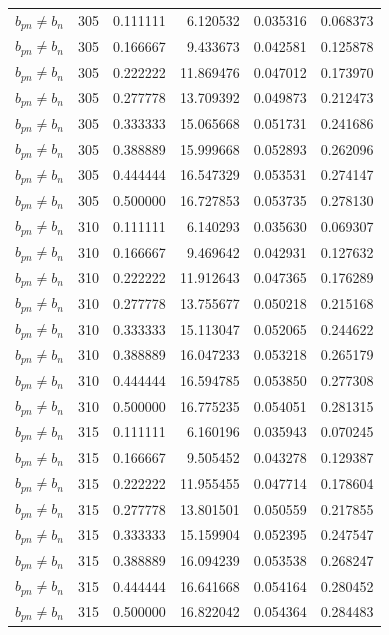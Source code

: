 \begin{longtable}{l r r r r r}
$b_{pn} \neq b_n$ & 305 & 0.111111 & 6.120532 & 0.035316 & 0.068373 \\
$b_{pn} \neq b_n$ & 305 & 0.166667 & 9.433673 & 0.042581 & 0.125878 \\
$b_{pn} \neq b_n$ & 305 & 0.222222 & 11.869476 & 0.047012 & 0.173970 \\
$b_{pn} \neq b_n$ & 305 & 0.277778 & 13.709392 & 0.049873 & 0.212473 \\
$b_{pn} \neq b_n$ & 305 & 0.333333 & 15.065668 & 0.051731 & 0.241686 \\
$b_{pn} \neq b_n$ & 305 & 0.388889 & 15.999668 & 0.052893 & 0.262096 \\
$b_{pn} \neq b_n$ & 305 & 0.444444 & 16.547329 & 0.053531 & 0.274147 \\
$b_{pn} \neq b_n$ & 305 & 0.500000 & 16.727853 & 0.053735 & 0.278130 \\
$b_{pn} \neq b_n$ & 310 & 0.111111 & 6.140293 & 0.035630 & 0.069307 \\
$b_{pn} \neq b_n$ & 310 & 0.166667 & 9.469642 & 0.042931 & 0.127632 \\
$b_{pn} \neq b_n$ & 310 & 0.222222 & 11.912643 & 0.047365 & 0.176289 \\
$b_{pn} \neq b_n$ & 310 & 0.277778 & 13.755677 & 0.050218 & 0.215168 \\
$b_{pn} \neq b_n$ & 310 & 0.333333 & 15.113047 & 0.052065 & 0.244622 \\
$b_{pn} \neq b_n$ & 310 & 0.388889 & 16.047233 & 0.053218 & 0.265179 \\
$b_{pn} \neq b_n$ & 310 & 0.444444 & 16.594785 & 0.053850 & 0.277308 \\
$b_{pn} \neq b_n$ & 310 & 0.500000 & 16.775235 & 0.054051 & 0.281315 \\
$b_{pn} \neq b_n$ & 315 & 0.111111 & 6.160196 & 0.035943 & 0.070245 \\
$b_{pn} \neq b_n$ & 315 & 0.166667 & 9.505452 & 0.043278 & 0.129387 \\
$b_{pn} \neq b_n$ & 315 & 0.222222 & 11.955455 & 0.047714 & 0.178604 \\
$b_{pn} \neq b_n$ & 315 & 0.277778 & 13.801501 & 0.050559 & 0.217855 \\
$b_{pn} \neq b_n$ & 315 & 0.333333 & 15.159904 & 0.052395 & 0.247547 \\
$b_{pn} \neq b_n$ & 315 & 0.388889 & 16.094239 & 0.053538 & 0.268247 \\
$b_{pn} \neq b_n$ & 315 & 0.444444 & 16.641668 & 0.054164 & 0.280452 \\
$b_{pn} \neq b_n$ & 315 & 0.500000 & 16.822042 & 0.054364 & 0.284483 \\

\end{longtable}
